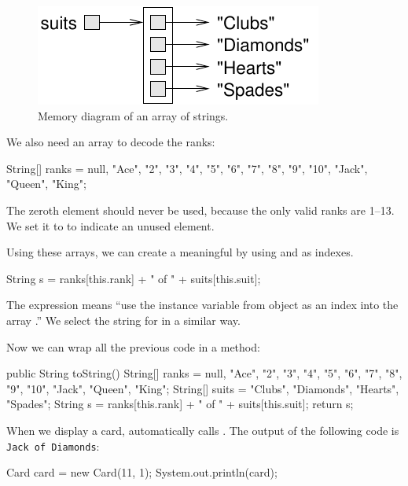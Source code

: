 \begin{figure}[!ht]
\begin{center}
\includegraphics{figs/stringarray.pdf}
\caption{Memory diagram of an array of strings.}
\label{fig.stringarray}
\end{center}
\end{figure}

We also need an array to decode the ranks:

\begin{code}
String[] ranks = {null, "Ace", "2", "3", "4", "5", "6",
           "7", "8", "9", "10", "Jack", "Queen", "King"};
\end{code}

The zeroth element should never be used, because the only valid ranks are 1--13.
We set it to  to indicate an unused element.

Using these arrays, we can create a meaningful  by using  and  as indexes.

\begin{code}
String s = ranks[this.rank] + " of " + suits[this.suit];
\end{code}

The expression  means ``use the instance variable  from  object as an index into the array .''
We select the string for  in a similar way.

Now we can wrap all the previous code in a  method:

\begin{code}
public String toString() {
    String[] ranks = {null, "Ace", "2", "3", "4", "5", "6",
               "7", "8", "9", "10", "Jack", "Queen", "King"};
    String[] suits = {"Clubs", "Diamonds", "Hearts", "Spades"};
    String s = ranks[this.rank] + " of " + suits[this.suit];
    return s;
}
\end{code}

When we display a card,  automatically calls .
The output of the following code is {\tt Jack of Diamonds}:

\begin{code}
Card card = new Card(11, 1);
System.out.println(card);
\end{code}


